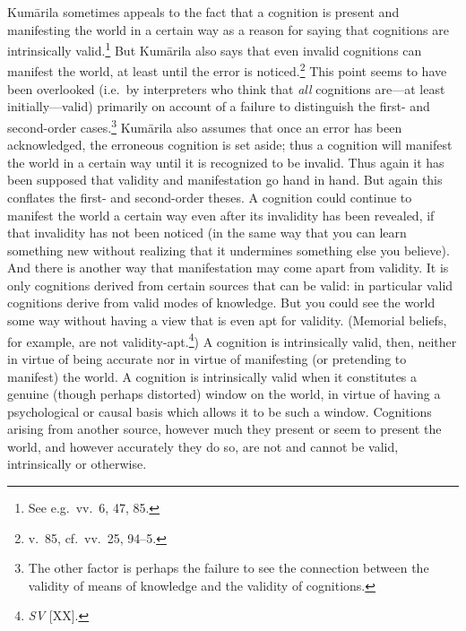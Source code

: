 \documentclass[11pt,letterpaper,oneside]{amsart}
\begin{document}



Kum\=arila sometimes appeals to the fact that a cognition is present and manifesting the world in a certain way as a reason for saying that cognitions are intrinsically valid.\footnote{See e.g.\ vv.\ 6, 47, 85.} But Kum\=arila also says that even invalid cognitions can manifest the world, at least until the error is noticed.\footnote{v.\ 85, cf.\ vv.\ 25, 94--5.} This point seems to have been overlooked (i.e.\ by interpreters who think that \emph{all} cognitions are---at least initially---valid) primarily on account of a failure to distinguish the first- and second-order cases.\footnote{The other factor is perhaps the failure to see the connection between the validity of means of knowledge and the validity of cognitions.} Kum\=arila also assumes that once an error has been acknowledged, the erroneous cognition is set aside; thus a cognition will manifest the world in a certain way until it is recognized to be invalid. Thus again it has been supposed that validity and manifestation go hand in hand. But again this conflates the first- and second-order theses. A cognition could continue to manifest the world a certain way even after its invalidity has been revealed, if that invalidity has not been noticed (in the same way that you can learn something new without realizing that it undermines something else you believe). And there is another way that manifestation may come apart from validity. It is only cognitions derived from certain sources that can be valid: in particular valid cognitions derive from valid modes of knowledge. But you could see the world some way without having a view that is even apt for validity. (Memorial beliefs, for example, are not validity-apt.\footnote{\emph{SV} [XX].}) A cognition is intrinsically valid, then, neither in virtue of being accurate nor in virtue of manifesting (or pretending to manifest) the world. A cognition is intrinsically valid when it constitutes a genuine (though perhaps distorted) window on the world, in virtue of having a psychological or causal basis which allows it to be such a window. Cognitions arising from another source, however much they present or seem to present the world, and however accurately they do so, are not and cannot be valid, intrinsically or otherwise.
\end{document}
